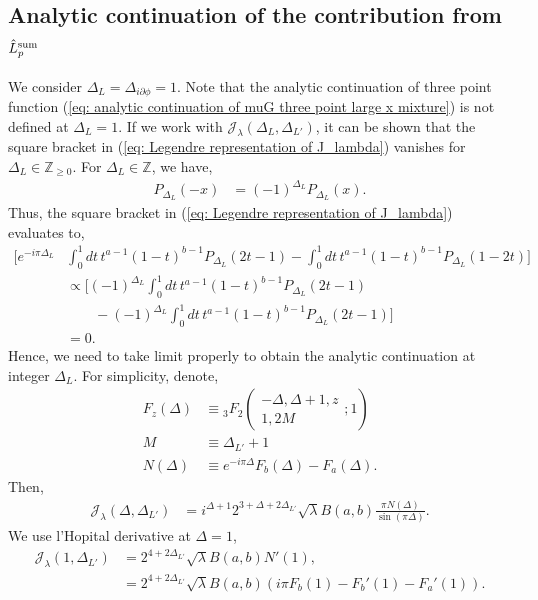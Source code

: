 \documentclass[11pt]{article}
\newcommand{\p}{\partial}
\newcommand{\nn}{\nonumber}
\newcommand{\lb}{\left(}
\newcommand{\rb}{\right)}
\begin{document}
\subsection{\texorpdfstring{Analytic continuation of the contribution from $\hat L^{\rm sum}_p$}{Analytic continuation of three point function Lp sum}}
We consider $\Delta_L = \Delta_{i\p\phi} = 1$. Note that the analytic continuation of three point function (\ref{eq: analytic continuation of muG three point large x mixture}) is not defined at $\Delta_L=1$. If we work with $\mathcal{J}_\lambda(\Delta_L,\Delta_{L'})$, it can be shown that the square bracket in (\ref{eq: Legendre representation of J_lambda}) vanishes for $\Delta_L\in \mathbb{Z}_{\geq 0}$. For $\Delta_L\in \mathbb{Z}$, we have,
\begin{align}
    P_{\Delta_L}(-x) &= (-1)^{\Delta_L}P_{\Delta_L}(x).
\end{align}
Thus, the square bracket in (\ref{eq: Legendre representation of J_lambda}) evaluates to,
\begin{align}
    \Big[ e^{-i\pi \Delta_L}&\int_0^1 dt\, t^{a-1}(1-t)^{b-1} P_{\Delta_L}(2t-1) - \int_0^1 dt \, t^{a-1}(1-t)^{b-1}P_{\Delta_L}(1-2t)\Big] 
    \nn\\
    &\propto  \Big[ (-1)^{\Delta_L} \int_0^1 dt\, t^{a-1}(1-t)^{b-1} P_{\Delta_L}(2t-1) \nn\\&\qquad- (-1)^{\Delta_L} \int_0^1 dt \, t^{a-1}(1-t)^{b-1}P_{\Delta_L}(2t-1)\Big] \\
    &=0.
\end{align}
Hence, we need to take limit properly to obtain the analytic continuation at integer $\Delta_L$. For simplicity, denote,
\begin{align}
    F_z(\Delta) &\equiv {}_3F_2\lb \begin{matrix}
        -\Delta , \Delta+1,z \\1,2M
    \end{matrix};1\rb \\
    M&\equiv \Delta_{L'}+1\\
    N(\Delta)&\equiv e^{-i\pi \Delta}F_b(\Delta) - F_a(\Delta).
\end{align}
Then, 
\begin{align}
    \mathcal{J}_\lambda(\Delta,\Delta_{L'}) &= i^{\Delta + 1} 2^{3+\Delta + 2\Delta_{L'}}\sqrt\lambda B(a,b) \frac{\pi N(\Delta)}{\sin(\pi \Delta)}.
\end{align}
We use l'Hopital derivative at $\Delta=1$, 
\begin{align}
    \mathcal{J}_\lambda(1,\Delta_{L'}) &= 2^{4+2\Delta_{L'}}\sqrt\lambda B(a,b)N'(1),
    \\&= 2^{4+2\Delta_{L'}}\sqrt\lambda B(a,b) \lb i\pi F_b(1) - F_b'(1) - F_a'(1) \rb.
\end{align}
\end{document}
